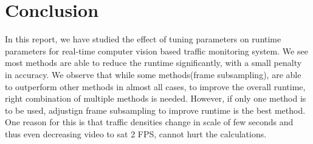 \documentclass[conference]{IEEEtran}
\begin{document}

\section{Conclusion}

In this report, we have studied the effect of tuning parameters on runtime parameters for real-time computer vision based traffic monitoring system.
We see most methods are able to reduce the runtime significantly, with a small penalty in accuracy.
We observe that while some methods(frame subsampling), are able to outperform other methods in almost all cases, to improve the overall runtime, right combination of multiple methods is needed.
However, if only one method is to be used, adjustign frame subsampling to improve runtime is the best method. One reason for this is that traffic densities change in scale of few seconds and thus even decreasing video to sat 2 FPS, cannot hurt the calculations.





\end{document}
